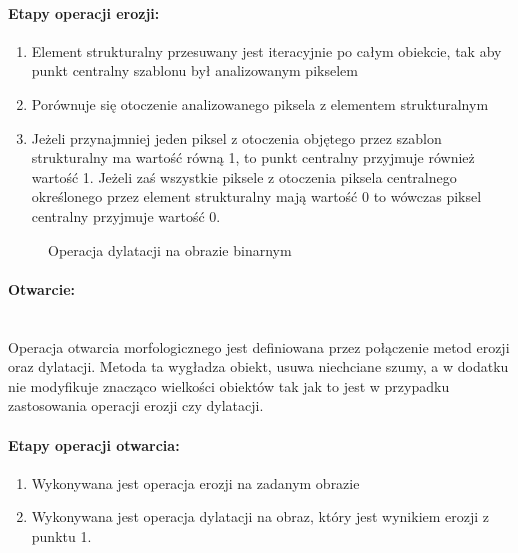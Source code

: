 \documentclass[a4paper,12pt,twoside,openany]{report}
\newcommand{\ImgPath}{.}
\begin{document}
\paragraph{Etapy operacji erozji:}
\begin{enumerate}
	\item Element strukturalny przesuwany jest iteracyjnie po całym obiekcie, tak aby punkt centralny szablonu był analizowanym pikselem
	\item Porównuje się otoczenie analizowanego piksela z elementem strukturalnym
	\item Jeżeli przynajmniej jeden piksel z otoczenia objętego przez szablon strukturalny ma wartość równą 1, to punkt centralny przyjmuje również wartość 1. Jeżeli zaś wszystkie piksele z otoczenia piksela centralnego określonego przez element strukturalny mają wartość 0 to wówczas piksel centralny przyjmuje wartość 0.
\end{enumerate}

\begin{figure}[H]
	\centering
	\caption{Operacja dylatacji na obrazie binarnym}
\end{figure}

\paragraph{Otwarcie:}\mbox{} \\
Operacja otwarcia morfologicznego jest definiowana przez połączenie metod erozji oraz dylatacji. Metoda ta wygładza obiekt, usuwa niechciane szumy, a w dodatku nie modyfikuje znacząco wielkości obiektów tak jak to jest w przypadku zastosowania operacji erozji czy dylatacji.

\paragraph{Etapy operacji otwarcia:}
\begin{enumerate}
	\item Wykonywana jest operacja erozji na zadanym obrazie
	\item Wykonywana jest operacja dylatacji na obraz, który jest wynikiem erozji z punktu 1.
\end{enumerate}
\end{document}
